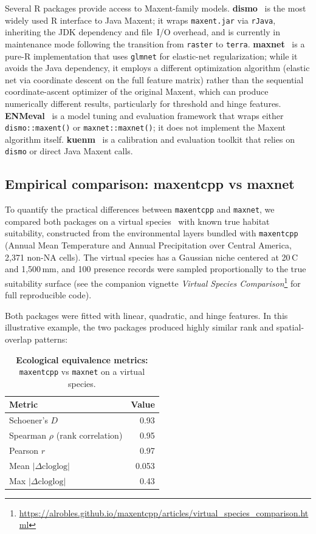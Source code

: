 \documentclass[10pt,letterpaper]{article}
\begin{document}
Several R packages provide access to Maxent-family models.
\textbf{dismo}~\cite{Hijmans2023} is the most widely used R interface
to Java Maxent; it wraps \texttt{maxent.jar} via \texttt{rJava},
inheriting the JDK dependency and file~I/O overhead, and is currently in
maintenance mode following the transition from \texttt{raster} to
\texttt{terra}.
\textbf{maxnet}~\cite{Phillips2024maxnet} is a pure-R implementation
that uses \texttt{glmnet} for elastic-net regularization; while it
avoids the Java dependency, it employs a different optimization
algorithm (elastic net via coordinate descent on the full feature
matrix) rather than the sequential coordinate-ascent optimizer of the
original Maxent, which can produce numerically different results,
particularly for threshold and hinge features.
\textbf{ENMeval}~\cite{Kass2021} is a model tuning and evaluation
framework that wraps either \texttt{dismo::maxent()} or
\texttt{maxnet::maxnet()}; it does not implement the Maxent algorithm
itself.
\textbf{kuenm}~\cite{Cobos2019} is a calibration and evaluation
toolkit that relies on \texttt{dismo} or direct Java Maxent calls.

\subsection*{Empirical comparison: maxentcpp vs maxnet}

To quantify the practical differences between \texttt{maxentcpp} and
\texttt{maxnet}, we compared both packages on a virtual
species~\cite{Leroy2016} with known true habitat suitability, constructed
from the environmental layers bundled with \texttt{maxentcpp} (Annual
Mean Temperature and Annual Precipitation over Central America, 2,371
non-NA cells).
The virtual species has a Gaussian niche centered at
20\,\textdegree{}C and 1,500\,mm, and 100 presence records were sampled
proportionally to the true suitability surface (see the companion
vignette \emph{Virtual Species Comparison}\footnote{%
  \url{https://alrobles.github.io/maxentcpp/articles/virtual_species_comparison.html}}
for full reproducible code).

Both packages were fitted with linear, quadratic, and hinge features.
In this illustrative example, the two packages produced highly similar
rank and spatial-overlap patterns:

\begin{table}[!ht]
\centering
\caption{{\bf Ecological equivalence metrics:} \texttt{maxentcpp} vs
         \texttt{maxnet} on a virtual species.}
\begin{tabular}{|l|r|}
\hline
\textbf{Metric} & \textbf{Value} \\
\hline
Schoener's $D$ & 0.93 \\
\hline
Spearman $\rho$ (rank correlation) & 0.95 \\
\hline
Pearson $r$ & 0.97 \\
\hline
Mean $|\Delta\text{cloglog}|$ & 0.053 \\
\hline
Max $|\Delta\text{cloglog}|$ & 0.43 \\
\hline
\end{tabular}
\label{tab:equivalence}
\end{table}
\end{document}
